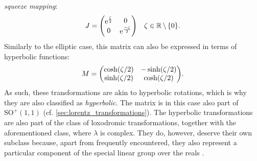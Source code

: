 \begin{enumerate}
        \emph{squeeze mapping}:
        \[ J = \mqty(\dmat[0]{\ec^{\frac{\zeta}{2}}, \ec^{\frac{-\zeta}{2}}})
        \quad \zeta \in \real\,\backslash\,\qty{0}. \]
        Similarly to the elliptic case, this matrix can also be expressed in terms of hyperbolic functions:
        \[ M = \mqty(\cosh(\zeta/2) & -\sinh(\zeta/2)\\ 
                     \sinh(\zeta/2) & \cosh(\zeta/2)). \]
        As such, these transformations are akin to hyperbolic rotations, which is why they are also classified as \emph{hyperbolic}. The matrix is in this case also part of $\text{SO}^+(1,1)$ (cf. \cref{sec:lorentz_transformations}). The hyperbolic transformations are also part of the class of loxodromic transformations, together with the aforementioned class, where \(\lambda\) is complex. They do, however, deserve their own subclass because, apart from frequently encountered, they also represent a particular component of the special linear group over the reals .
\end{enumerate}

